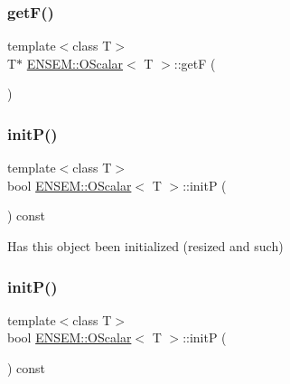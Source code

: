 \mbox{\label{classENSEM_1_1OScalar_a040999918115f255a411fd96ad87663f}} 
\subsubsection{\texorpdfstring{getF()}{getF()}\hspace{0.1cm}{\footnotesize\ttfamily [6/6]}}
{\footnotesize\ttfamily template$<$class T$>$ \\
T$\ast$ \mbox{\hyperlink{classENSEM_1_1OScalar}{E\+N\+S\+E\+M\+::\+O\+Scalar}}$<$ T $>$\+::getF (\begin{DoxyParamCaption}{ }\end{DoxyParamCaption})\hspace{0.3cm}{\ttfamily [inline]}}

\mbox{\label{classENSEM_1_1OScalar_a2de94d9cb377fa4ca961d0a8906a76b6}} 
\subsubsection{\texorpdfstring{initP()}{initP()}\hspace{0.1cm}{\footnotesize\ttfamily [1/3]}}
{\footnotesize\ttfamily template$<$class T$>$ \\
bool \mbox{\hyperlink{classENSEM_1_1OScalar}{E\+N\+S\+E\+M\+::\+O\+Scalar}}$<$ T $>$\+::initP (\begin{DoxyParamCaption}{ }\end{DoxyParamCaption}) const\hspace{0.3cm}{\ttfamily [inline]}}



Has this object been initialized (resized and such) 

\mbox{\label{classENSEM_1_1OScalar_a2de94d9cb377fa4ca961d0a8906a76b6}} 
\subsubsection{\texorpdfstring{initP()}{initP()}\hspace{0.1cm}{\footnotesize\ttfamily [2/3]}}
{\footnotesize\ttfamily template$<$class T$>$ \\
bool \mbox{\hyperlink{classENSEM_1_1OScalar}{E\+N\+S\+E\+M\+::\+O\+Scalar}}$<$ T $>$\+::initP (\begin{DoxyParamCaption}{ }\end{DoxyParamCaption}) const\hspace{0.3cm}{\ttfamily [inline]}}



